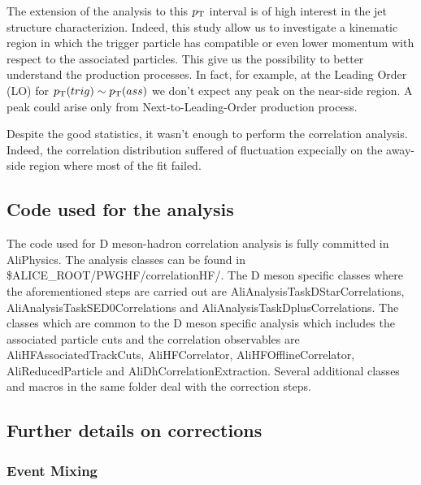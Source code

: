 The extension of the analysis to this $p_{\rm T}$ interval is of high interest in the jet structure characterizion. Indeed, this study allow us to investigate a kinematic region in which the trigger particle has compatible or even lower momentum with respect to the associated particles. This give us the possibility to better understand the production processes. In fact, for example, at the Leading Order (LO) for $p_{\rm T} (trig) \sim p_{\rm T}(ass)$ we don't expect any peak on the near-side region. A peak could arise only from Next-to-Leading-Order production process.

Despite the good statistics, it wasn't enough to perform the correlation analysis. Indeed, the correlation distribution suffered of fluctuation expecially on the away-side region where most of the fit failed. 



\subsection{Code used for the analysis}
The code used for D meson-hadron correlation analysis is fully committed in AliPhysics. The analysis classes can be found in
\$ALICE\_ROOT/PWGHF/correlationHF/.  The  D meson specific classes where the aforementioned steps are carried out are
AliAnalysisTaskDStarCorrelations, AliAnalysisTaskSED0Correlations and AliAnalysisTaskDplusCorrelations. The classes which are common to the D meson specific analysis which includes the associated particle cuts and the correlation observables are AliHFAssociatedTrackCuts, AliHFCorrelator, AliHFOfflineCorrelator, AliReducedParticle and AliDhCorrelationExtraction. Several additional classes and macros in the same folder deal with the correction steps.


\subsection{Further details on corrections}
\subsubsection{Event Mixing}


